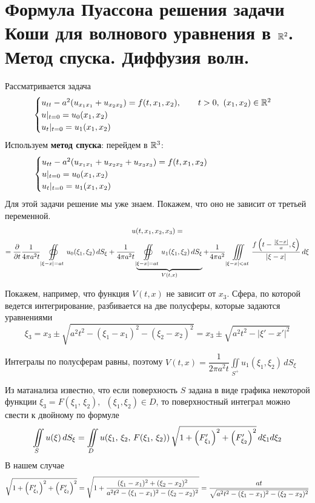 \documentclass[../main.tex]{subfiles}
\begin{document}
\section[Волновое уравнение в \texorpdfstring{$\R^2$}{R\textasciicircum 2}]{Формула Пуассона решения задачи Коши для волнового уравнения в $\R^2$. Метод спуска. Диффузия волн.}
Рассматривается задача
\begin{equation}
\label{eq::7::cauchy}
\begin{cases}
  u_{tt}-a^2(u_{x_1x_1}+u_{x_2x_2})=f(t,x_1,x_2),\qquad t>0,\ (x_1, x_2)\in \mathbb{R}^2\\
  u|_{t=0}=u_0(x_1, x_2)\\ 
  u_t|_{t=0}=u_1(x_1, x_2)
\end{cases}
\end{equation}
Используем \textbf{метод спуска}: перейдем в $\mathbb{R}^3$:
\begin{equation*}
\begin{cases}
  u_{tt}-a^2(u_{x_1x_1}+u_{x_2x_2}+u_{x_3x_3})=f(t,x_1,x_2) \hspace{7.5em}\\
  u|_{t=0}=u_0(x_1, x_2)\\
  u_t|_{t=0}=u_1(x_1, x_2)
\end{cases}
\end{equation*}
Для этой задачи решение мы уже знаем. Покажем, что оно не зависит от третьей переменной.
\begin{multline*}
u(t, x_1, x_2, x_3) = \\
= \dfrac{\partial }{\partial t} \frac{1}{4\pi a^2t} \oiint\limits_{|\xi-x|=at} u_0(\xi_1, \xi_2)\, dS_\xi 
+\frac{1}{4\pi a^2t}\underbrace{\oiint\limits_{|\xi-x|=at} u_1(\xi_1, \xi_2)\, dS_{\xi}}_{V(t,x)}
+\frac{1}{4\pi a^2}\iiint\limits_{|\xi - x|<at}\frac{f\left(t-\frac{|\xi - x|}{a}, \xi \right)}{|\xi - x|}\, d\xi
\end{multline*}

Покажем, например, что функция $V(t,x)$ не зависит от $x_3$. Сфера, по которой ведется интегрирование, разбивается на две полусферы, которые задаются уравнениями
$$\xi_3=x_3\pm \sqrt{a^2t^2-(\xi_1 -x_1)^2-(\xi_2 -x_2)^2}=x_3\pm \sqrt{a^2t^2-|\xi '-x'|^2}$$

Интегралы по полусферам равны, поэтому $V(t,x)=\dfrac{1}{2\pi a^2t}\displaystyle\iint\limits_{S^+}u_1(\xi_1, \xi_2)\, dS_{\xi}$

Из матанализа известно, что если поверхность $S$ задана в виде графика некоторой функции $\xi_3=F(\xi_1,\, \xi_2),\;\ (\xi_1, \xi_2)\in D$, то поверхностный интеграл можно свести к двойному по формуле
\[
\iint\limits_S u(\xi )\, dS_{\xi}=\iint\limits_D u(\xi_1,\, \xi_2,\, F(\xi_1,\, \xi_2))\, 
\sqrt{1 + \left(F'_{\xi_1}\right)^2 + \left(F'_{\xi_2}\right)^2}\, d\xi_1 d\xi_2
\]
В нашем случае 
$$
\sqrt{1 + \left(F'_{\xi_1}\right)^2 + \left(F'_{\xi_2}\right)^2}
=\sqrt{1+\dfrac{(\xi_1 - x_1)^2+(\xi_2 - x_2)^2}{a^2t^2 - (\xi_1 - x_1)^2-(\xi_2 - x_2)^2}}
=\dfrac{at}{\sqrt{a^2t^2 - (\xi_1 - x_1)^2-(\xi_2 - x_2)^2}}$$
\end{document}
